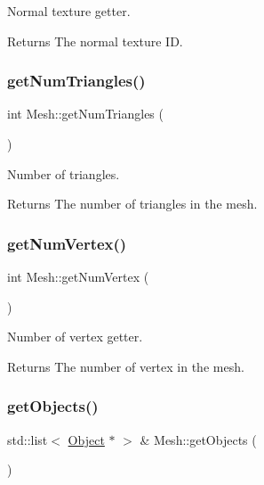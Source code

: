 Normal texture getter. 

\begin{DoxyReturn}{Returns}
The normal texture ID. 
\end{DoxyReturn}
\mbox{\label{class_mesh_a4452aed4ac63ff0639b839bba095347e}} 
\subsubsection{\texorpdfstring{get\+Num\+Triangles()}{getNumTriangles()}}
{\footnotesize\ttfamily int Mesh\+::get\+Num\+Triangles (\begin{DoxyParamCaption}{ }\end{DoxyParamCaption})}



Number of triangles. 

\begin{DoxyReturn}{Returns}
The number of triangles in the mesh. 
\end{DoxyReturn}
\mbox{\label{class_mesh_ae4163571bceed9d224fc43e943dda118}} 
\subsubsection{\texorpdfstring{get\+Num\+Vertex()}{getNumVertex()}}
{\footnotesize\ttfamily int Mesh\+::get\+Num\+Vertex (\begin{DoxyParamCaption}{ }\end{DoxyParamCaption})}



Number of vertex getter. 

\begin{DoxyReturn}{Returns}
The number of vertex in the mesh. 
\end{DoxyReturn}
\mbox{\label{class_mesh_aadc3cc59b0dccf99961105431a717579}} 
\subsubsection{\texorpdfstring{get\+Objects()}{getObjects()}}
{\footnotesize\ttfamily std\+::list$<$ \hyperlink{class_object}{Object} $\ast$ $>$ \& Mesh\+::get\+Objects (\begin{DoxyParamCaption}{ }\end{DoxyParamCaption})}



